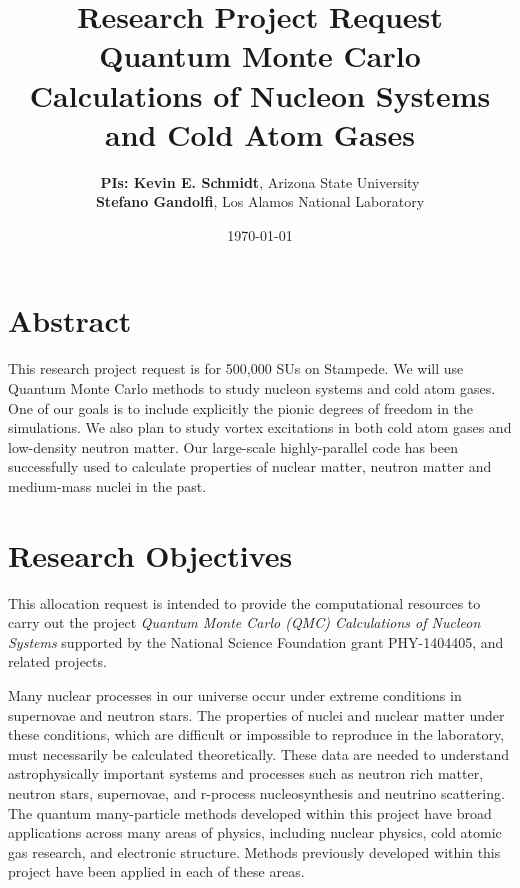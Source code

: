 \documentclass[12pt,letterpaper]{article}
\newcommand{\project}{\large Research Project Request  \vskip 0.1cm}
\begin{document}
\onehalfspacing
\title{\project {\Large \textbf{Quantum Monte Carlo Calculations of Nucleon Systems and Cold Atom Gases}} \vspace{0cm}}
\author{
{\bf PIs: Kevin E. Schmidt}, Arizona State University \\
{\bf Stefano Gandolfi}, Los Alamos National Laboratory
}
\date{\today}
\maketitle

\section*{Abstract}

This research project request is for 500,000 SUs on Stampede. We will use 
Quantum Monte Carlo methods to study nucleon systems and cold atom gases. 
One of our goals is to include explicitly the pionic degrees of freedom in 
the simulations. We also plan to study vortex excitations in both cold atom 
gases and low-density neutron matter. Our large-scale highly-parallel code 
has been successfully used to calculate properties of nuclear matter, 
neutron matter and medium-mass nuclei in the past.

\section{Research Objectives}

This allocation request is intended to provide the computational resources 
to carry out the project \textit{Quantum Monte Carlo (QMC) Calculations of 
Nucleon Systems} supported by the National Science Foundation grant 
PHY-1404405, and related projects.

Many nuclear processes in our universe occur under extreme conditions in 
supernovae and neutron stars. The properties of nuclei and nuclear matter 
under these conditions, which are difficult or impossible to reproduce in 
the laboratory, must necessarily be calculated theoretically. These data are 
needed to understand astrophysically important systems and processes such as 
neutron rich matter, neutron stars, supernovae, and r-process 
nucleosynthesis and neutrino scattering. The quantum many-particle methods 
developed within this project have broad applications across many areas of 
physics, including nuclear physics, cold atomic gas research, and electronic structure. Methods 
previously developed within this project have been applied in each of these 
areas.
\end{document}
